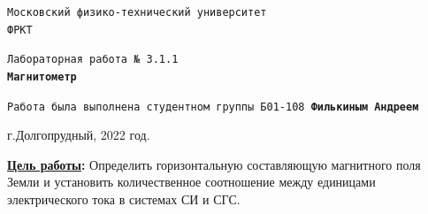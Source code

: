 \documentclass[a4paper,12pt]{article} %
\begin{document}
	
	
	\begin{titlepage}
		\begin{center}
			\large \texttt{Московский физико-технический университет} \\
			\large \texttt{ФРКТ} \\
			\vspace{0.2cm}
			
			\vspace{4.5cm}
			\LARGE {\texttt{Лабораторная работа № 3.1.1}} \\ \vspace{0.2cm}
			\LARGE \textbf{\texttt{Магнитометр}}
		\end{center}
		\vspace{2.3cm} \large
		
		\begin{center}
			\texttt{Работа была выполнена студентном группы Б01-108 \textbf{Филькиным Андреем}}
		\end{center}
		\begin{center} \vspace{50mm}
			г.Долгопрудный, 2022 год.\\
		\end{center}
	\end{titlepage}
\newpage

\textbf{\underline{Цель работы}:} Определить горизонтальную составляющую магнитного поля Земли и установить количественное соотношение между единицами электрического тока в системах СИ и СГС.
\end{document}
